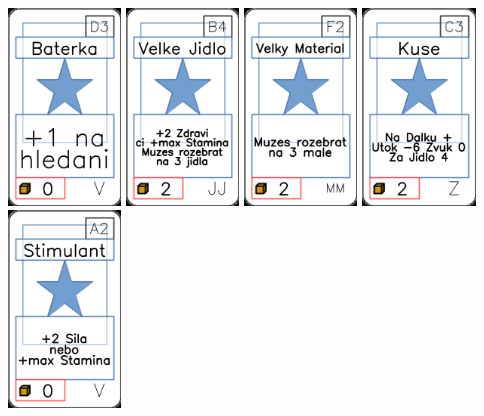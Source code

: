 \documentclass[a4paper]{article}
\begin{document}
	\includegraphics[width=3.0cm]{img-1_77}
	\includegraphics[width=3.0cm]{img-1_38}
	\includegraphics[width=3.0cm]{img-1_56}
	\includegraphics[width=3.0cm]{img-1_102}
	\includegraphics[width=3.0cm]{img-1_61}
\end{document}

